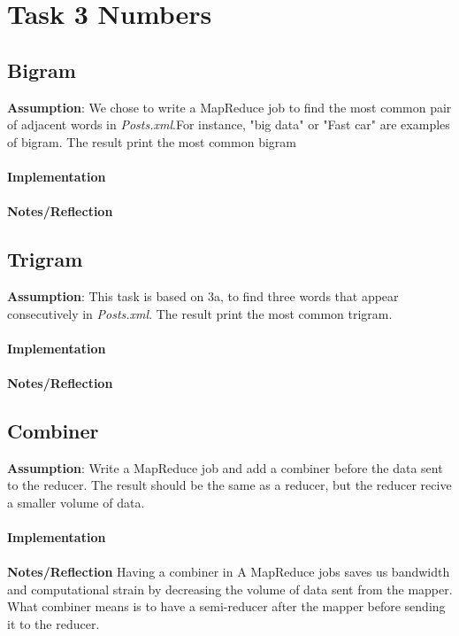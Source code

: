 \documentclass[fleqn,10pt]{wlscirep}
\begin{document}
\section{Task 3 Numbers}

\subsection{Bigram }
\textbf{Assumption}: We chose to write a MapReduce job to find the most common pair of adjacent words in \textit{Posts.xml}.For instance, "big data" or "Fast car" are examples of bigram. The result print the most common bigram   \\\\
\textbf{Implementation}  \\ \\
\textbf{Notes/Reflection}


\subsection{Trigram }
\textbf{Assumption}: This task is based on 3a, to find three words that appear consecutively in \textit{Posts.xml}. The result print the most common trigram.  \\ \\
\textbf{Implementation}  \\ \\
\textbf{Notes/Reflection}


\subsection{Combiner }
\textbf{Assumption}: Write a MapReduce job and add a combiner before  the data sent to the reducer. The result should be the same as a reducer, but the reducer recive a smaller volume of data.  \\ \\
\textbf{Implementation}  \\ \\
\textbf{Notes/Reflection} Having a combiner in A MapReduce jobs saves us bandwidth and computational strain by decreasing the volume of data sent from the mapper.  What combiner means is to have a semi-reducer after the mapper before sending it to the reducer. 

\end{document}

